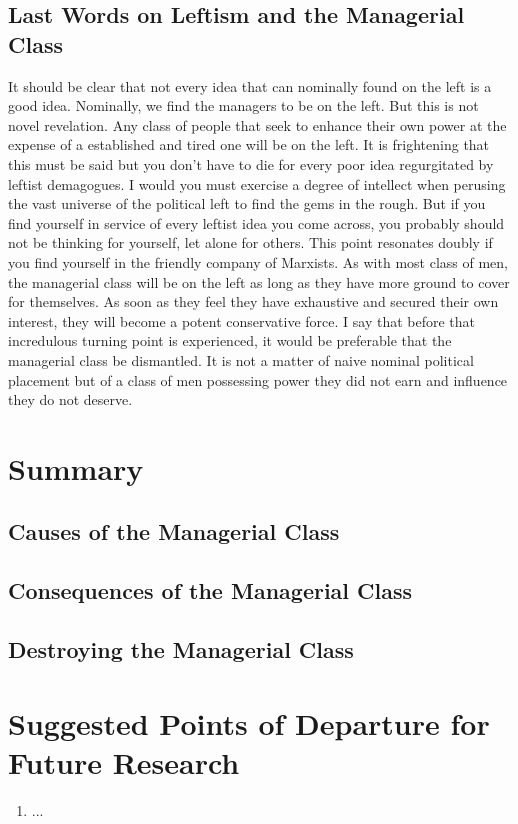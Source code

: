 \documentclass[12pt]{article}
\begin{document}
\subsection{Last Words on Leftism and the Managerial Class}
It should be clear that not every idea that can nominally found on the left is a good idea.
Nominally, we find the managers to be on the left.
But this is not novel revelation.
Any class of people that seek to enhance their own power at the expense of a established and tired one will be on the left.
It is frightening that this must be said but you don't have to die for every poor idea regurgitated by leftist demagogues.
I would you must exercise a degree of intellect when perusing the vast universe of the political left to find the gems in the rough.
But if you find yourself in service of every leftist idea you come across, you probably should not be thinking for yourself, let alone for others.
This point resonates doubly if you find yourself in the friendly company of Marxists.
As with most class of men, the managerial class will be on the left as long as they have more ground to cover for themselves.
As soon as they feel they have exhaustive and secured their own interest, they will become a potent conservative force.
I say that before that incredulous turning point is experienced, it would be preferable that the managerial class be dismantled.
It is not a matter of naive nominal political placement but of a class of men possessing power they did not earn and influence they do not deserve.

\section{Summary}
\subsection{Causes of the Managerial Class}
\subsection{Consequences of the Managerial Class}
\subsection{Destroying the Managerial Class}

\section{Suggested Points of Departure for Future Research}


\begin{enumerate}
    \item ...
\end{enumerate}
\end{document}
